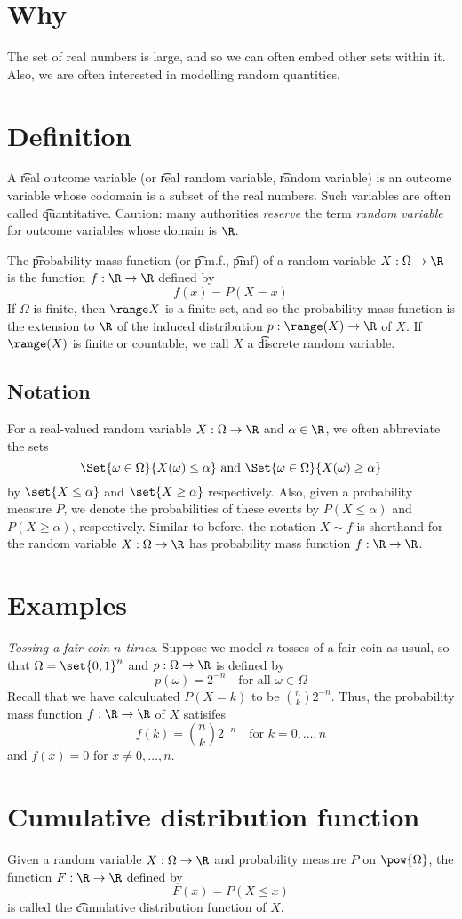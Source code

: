 
\section*{Why}

The set of real numbers is large, and so we can often embed other sets within it.
Also, we are often interested in modelling random quantities.

\section*{Definition}

A \t{real outcome variable} (or \t{real random variable}, \t{random variable}) is an outcome variable whose codomain is a subset of the real numbers.
Such variables are often called \t{quantitative}.
Caution: many authorities \textit{reserve} the term \textit{random variable} for outcome variables whose domain is $\R $.

The \t{probability mass function} (or \t{p.m.f.}, \t{pmf}) of a random variable $X: \Omega  \to \R $ is the function $f: \R \to \R $ defined by
\[
f(x) = P(X = x)
\]
If $\Omega $ is finite, then $\range X$ is a finite set, and so the probability mass function is the extension to $\R $ of the induced distribution $p: \range(X) \to \R $ of $X$.
If $\range(X)$ is finite or countable, we call $X$ a \t{discrete random variable}.

\subsection*{Notation}

For a real-valued random variable $X: \Omega  \to \R $ and $\alpha  \in \R $, we often abbreviate the sets
\[
\Set{\omega  \in \Omega }{X(\omega ) \leq \alpha } \text{ and } \Set{\omega  \in \Omega }{X(\omega ) \geq \alpha }
\]
by $\set{X \leq \alpha }$ and $\set{X \geq \alpha }$ respectively.
Also, given a probability measure $P$, we denote the probabilities of these events by $P(X \leq \alpha )$ and $P(X \geq \alpha )$, respectively.
Similar to before, the notation $X \sim f$ is shorthand for the random variable $X: \Omega  \to \R $ has probability mass function $f: \R  \to \R $.

\section*{Examples}

\textit{Tossing a fair coin $n$ times}.
Suppose we model $n$ tosses of a fair coin as usual, so that $\Omega  = \set{0,1}^n$ and $p: \Omega  \to \R $ is defined by
\[
p(\omega ) = 2^{-n} \quad \text{for all } \omega  \in \Omega
\]
Recall that we have calculuated $P(X = k)$ to be ${n \choose k} 2^{-n}$.
Thus, the probability mass function $f: \R  \to \R $ of $X$ satisifes
\[
f(k) = {n \choose k} 2^{-n} \quad \text{for } k = 0, \dots , n
\]
and $f(x) = 0$ for $x \neq 0, \dots , n$.

\section*{Cumulative distribution function}

Given a random variable $X: \Omega  \to \R $ and probability measure $P$ on $\pow{\Omega }$, the function $F: \R  \to \R $ defined by
\[
F(x) = P(X \leq x)
\]
is called the \t{cumulative distribution function} of $X$.

\blankpage
